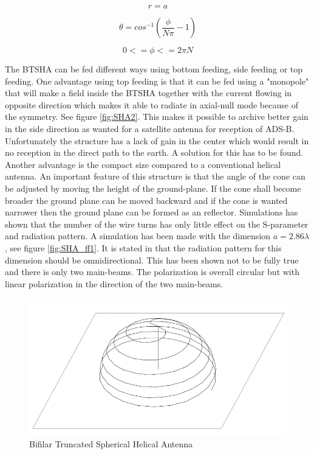 \begin{equation}\label{eq:SHA1}
r = a
\end{equation}

\begin{equation}\label{eq:SHA2}
\theta = cos^{-1}(\frac{\phi}{N\pi}-1)
\end{equation}

\begin{equation}\label{eq:SHA3}
0<=\phi<=2\pi N
\end{equation}

The BTSHA can be fed different ways using bottom feeding, side feeding or top feeding. One advantage using top feeding is that it can be fed using a "monopole" that will make a field inside the BTSHA together with the current flowing in opposite direction which makes it able to radiate in axial-null mode because of the symmetry. See figure \ref{fig:SHA2}. This makes it possible to archive better gain in the side direction as wanted for a satellite antenna for reception of ADS-B. Unfortunately the structure has a lack of gain in the center which would result in no reception in the direct path to the earth. A solution for this has to be found. Another advantage is the compact size compared to a conventional helical antenna. An important feature of this structure is that the angle of the cone can be adjusted by moving the height of the ground-plane. If the cone shall become broader the ground plane can be moved backward and if the cone is wanted narrower then the ground plane can be formed as an reflector. Simulations has shown that the number of the wire turns has only little effect on the S-parameter and radiation pattern. A simulation has been made with the dimension $a=2.86\lambda$, see figure \ref{fig:SHA_ff1}. It is stated in \citep{Clark2003} that the radiation pattern for this dimension should be omnidirectional. This has been shown not to be fully true and there is only two main-beams. The polarization is overall circular but with linear polarization in the direction of the two main-beams.    

\begin{figure}[H]
\centering 
\includegraphics[scale = 0.5]{figures/antennas/hemispherical/hemispherical1}
\caption{Bifilar Truncated Spherical Helical Antenna \citep{Clark2003}}
\label{fig:SHA1}
\end{figure} 

